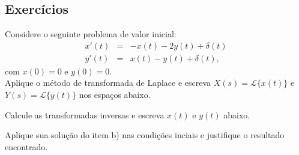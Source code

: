  \subsection*{Exercícios}
\begin{exer}
Considere o seguinte problema de valor inicial:
 \begin{eqnarray*}
x'(t)&=&- x(t) -2 y(t)+\delta(t)\\
y'(t)&=& x(t) - y(t)+\delta(t),
\end{eqnarray*}
com $x(0)=0$ e $y(0)=0$.\\
   Aplique o método de transformada de Laplace e escreva $X(s)=\mathcal{L}\{x(t)\}$ e $Y(s)=\mathcal{L}\{y(t)\}$ nos espaços abaixo.
 
  Calcule as transformadas inversas e escreva $x(t)$ e $y(t)$ abaixo.

 Aplique sua solução do item b) nas condições inciais e justifique o resultado encontrado.\\

\end{exer}


